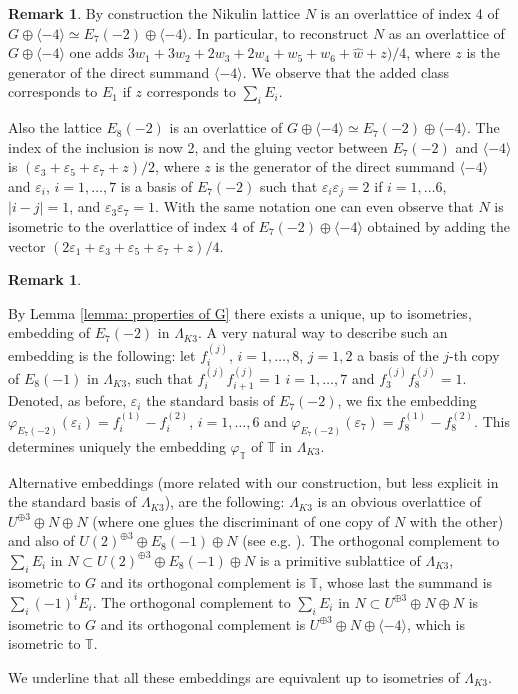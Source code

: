 \documentclass{amsart}
\theoremstyle{definition}
\newtheorem{rem}[thm]{Remark}
\numberwithin{equation}{section}
\numberwithin{equation}{section} \theoremstyle{definition}
\begin{document}
\begin{rem}{\rm By construction the Nikulin lattice $N$ is an overlattice of index 4 of $G\oplus\langle -4\rangle\simeq E_7(-2)\oplus \langle -4\rangle$. In particular, to reconstruct $N$ as an overlattice of $G\oplus\langle -4\rangle$ one adds  $3w_1  +3w_2+ 2w_3  +2w_4+  w_5 + w_6  +\hat{w}  +z )/4$, where $z$ is the generator of the direct summand $\langle -4\rangle$. We observe that the added class corresponds to $E_1$ if $z$ corresponds to $\sum_iE_i$. 

Also the lattice $E_8(-2)$ is an overlattice of $G\oplus\langle -4\rangle\simeq E_7(-2)\oplus \langle -4\rangle$. The index of the inclusion is now 2, and the gluing vector between $E_7(-2)$ and $\langle-4\rangle$ is $(\varepsilon_3+\varepsilon_5+\varepsilon_7+z)/2$, where $z$ is the generator of the direct summand $\langle -4\rangle$ and $\varepsilon_i$, $i=1,\ldots, 7$ is a basis of $E_7(-2)$ such that $\varepsilon_i\varepsilon_j=2$ if $i=1,\ldots 6$, $|i-j|=1$, and $\varepsilon_3\varepsilon_7=1$.
With the same notation one can even observe that $N$ is isometric to the overlattice of index 4 of $E_7(-2)\oplus\langle -4\rangle$ obtained by adding the vector $(2\varepsilon_1+ \varepsilon_3+\varepsilon_5+\varepsilon_7+z)/4$.}  
\end{rem}

\begin{rem}\label{rem: embedding E7(-2) in LambdaK3}
{\rm By Lemma \ref{lemma: properties of G} there exists a unique, up to isometries, embedding of $E_7(-2)$ in $\Lambda_{K3}$. A very natural way to describe such an embedding is the following: let $f_i^{(j)}$, $i=1,\ldots,8$, $j=1,2$ a basis of the $j$-th copy of $E_8(-1)$ in $\Lambda_{K3}$, such that $f_i^{(j)}f_{i+1}^{(j)}=1$ $i=1,\ldots ,7$ and $f_3^{(j)}f_{8}^{(j)}=1$. Denoted, as before, $\varepsilon_i$ the standard basis of $E_7(-2)$, we fix the embedding $\varphi_{E_7(-2)}(\varepsilon_i)=f_i^{(1)}-f_i^{(2)}$, $i=1,\ldots, 6$ and   $\varphi_{E_7(-2)}(\varepsilon_7)=f_8^{(1)}-f_8^{(2)}$. This determines uniquely the embedding $\varphi_{\mathbb{T}}$ of $\mathbb{T}$ in $\Lambda_{K3}$.


Alternative embeddings (more related with our construction, but less explicit in the standard basis of $\Lambda_{K3}$), are the following: $\Lambda_{K3}$ is an obvious overlattice of $U^{\oplus 3}\oplus N\oplus N$ (where one glues the discriminant of one copy of $N$ with the other) and also of $U(2)^{\oplus 3}\oplus E_8(-1)\oplus N$ (see e.g. \cite{vGS}). The orthogonal complement to $\sum_i E_i$ in $N\subset U(2)^{\oplus 3}\oplus E_8(-1)\oplus N$ %
is a primitive sublattice of $\Lambda_{K3}$, isometric to $G$ and its orthogonal complement is $\mathbb{T}$, whose last the summand is $\sum_i(-1)^{i} E_i$. The orthogonal complement to $\sum_i E_i$ in $N\subset U^{\oplus 3}\oplus N\oplus N$ is isometric to $G$ and its orthogonal complement is $U^{\oplus 3}\oplus N\oplus \langle -4\rangle$, which is isometric to $\mathbb{T}$.

We underline that all these embeddings are equivalent up to isometries of $\Lambda_{K3}$.}
\end{rem}
\end{document}
